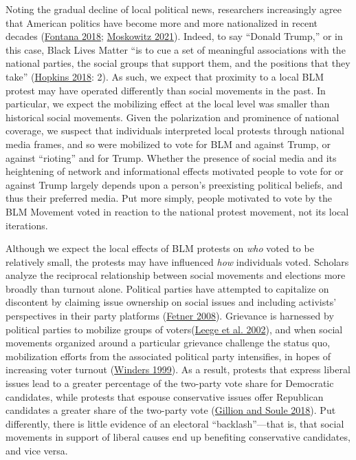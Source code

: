 \documentclass[
  12pt,
]{article}
\begin{document}
Noting the gradual decline of local political news, researchers increasingly agree that American politics have become more and more nationalized in recent decades (\protect\hyperlink{ref-Fontana2018}{Fontana 2018}; \protect\hyperlink{ref-Moskowitz2021}{Moskowitz 2021}). Indeed, to say ``Donald Trump,'' or in this case, Black Lives Matter ``is to cue a set of meaningful associations with the national parties, the social groups that support them, and the positions that they take'' (\protect\hyperlink{ref-Hopkins2018}{Hopkins 2018}: 2). As such, we expect that proximity to a local BLM protest may have operated differently than social movements in the past. In particular, we expect the mobilizing effect at the local level was smaller than historical social movements. Given the polarization and prominence of national coverage, we suspect that individuals interpreted local protests through national media frames, and so were mobilized to vote for BLM and against Trump, or against ``rioting'' and for Trump. Whether the presence of social media and its heightening of network and informational effects motivated people to vote for or against Trump largely depends upon a person's preexisting political beliefs, and thus their preferred media. Put more simply, people motivated to vote by the BLM Movement voted in reaction to the national protest movement, not its local iterations.

Although we expect the local effects of BLM protests on \emph{who} voted to be relatively small, the protests may have influenced \emph{how} individuals voted. Scholars analyze the reciprocal relationship between social movements and elections more broadly than turnout alone. Political parties have attempted to capitalize on discontent by claiming issue ownership on social issues and including activists' perspectives in their party platforms (\protect\hyperlink{ref-Fetner2008}{Fetner 2008}). Grievance is harnessed by political parties to mobilize groups of voters(\protect\hyperlink{ref-Leege2002}{Leege et al. 2002}), and when social movements organized around a particular grievance challenge the status quo, mobilization efforts from the associated political party intensifies, in hopes of increasing voter turnout (\protect\hyperlink{ref-Winders1999}{Winders 1999}). As a result, protests that express liberal issues lead to a greater percentage of the two-party vote share for Democratic candidates, while protests that espouse conservative issues offer Republican candidates a greater share of the two-party vote (\protect\hyperlink{ref-Gillion2018}{Gillion and Soule 2018}). Put differently, there is little evidence of an electoral ``backlash''---that is, that social movements in support of liberal causes end up benefiting conservative candidates, and vice versa.
\end{document}
